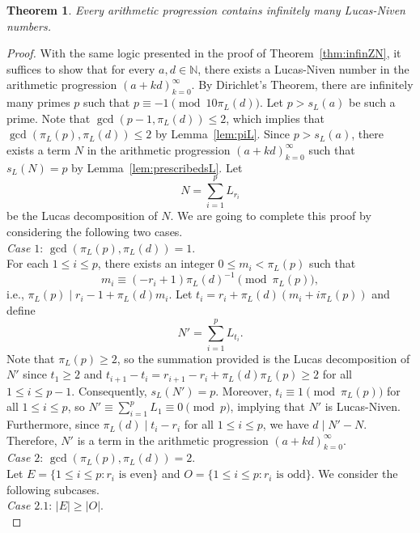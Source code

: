 \documentclass[12pt]{article}
\newtheorem{theorem}{Theorem}[section]
\theoremstyle{definition}
\newcommand{\N}{\mathbb{N}}
\begin{document}
\begin{theorem}\label{thm:infinLN}
Every arithmetic progression contains infinitely many Lucas-Niven numbers.
\end{theorem}
\begin{proof}
With the same logic presented in the proof of Theorem~\ref{thm:infinZN}, it suffices to show that for every $a,d\in\N$, there exists a Lucas-Niven number in the arithmetic progression $(a+kd)_{k=0}^\infty$. By Dirichlet's Theorem, there are infinitely many primes $p$ such that $p\equiv-1\pmod{10\pi_L(d)}$. Let $p>s_L(a)$ be such a prime. Note that $\gcd(p-1,\pi_L(d))\leq2$, which implies that $\gcd(\pi_L(p),\pi_L(d))\leq2$ by Lemma~\ref{lem:piL}. Since $p>s_L(a)$, there exists a term $N$ in the arithmetic progression $(a+kd)_{k=0}^\infty$ such that $s_L(N)=p$ by Lemma~\ref{lem:prescribedsL}. Let
\[N=\sum_{i=1}^pL_{r_i}\]
be the Lucas decomposition of $N$. We are going to complete this proof by considering the following two cases.\\

\noindent\textit{Case $1$}: $\gcd(\pi_L(p),\pi_L(d))=1$.\\

For each $1\leq i\leq p$, there exists an integer $0\leq m_i<\pi_L(p)$ such that
\[m_i\equiv(-r_i+1)\pi_L(d)^{-1}\pmod{\pi_L(p)},\]
i.e., $\pi_L(p)\mid r_i-1+\pi_L(d)m_i$. Let $t_i=r_i+\pi_L(d)(m_i+i\pi_L(p))$ and define
\[N'=\sum_{i=1}^pL_{t_i}.\]
Note that $\pi_L(p)\geq2$, so the summation provided is the Lucas decomposition of $N'$ since $t_1\geq2$ and $t_{i+1}-t_i=r_{i+1}-r_i+\pi_L(d)\pi_L(p)\geq2$ for all $1\leq i\leq p-1$. Consequently, $s_L(N')=p$. Moreover, $t_i\equiv 1\pmod{\pi_L(p)}$ for all $1\leq i\leq p$, so $N'\equiv\sum_{i=1}^pL_1\equiv0\pmod{p}$, implying that $N'$ is Lucas-Niven. Furthermore, since $\pi_L(d)\mid t_i-r_i$ for all $1\leq i\leq p$, we have $d\mid N'-N$. Therefore, $N'$ is a term in the arithmetic progression $(a+kd)_{k=0}^\infty$.\\

\noindent\textit{Case $2$}: $\gcd(\pi_L(p),\pi_L(d))=2$.\\

Let $E=\{1\leq i\leq p:r_i\text{ is even}\}$ and $O=\{1\leq i\leq p:r_i\text{ is odd}\}$. We consider the following subcases.\\

\noindent\textit{Case $2.1$}: $|E|\geq|O|$.\\


\end{proof}
\end{document}
